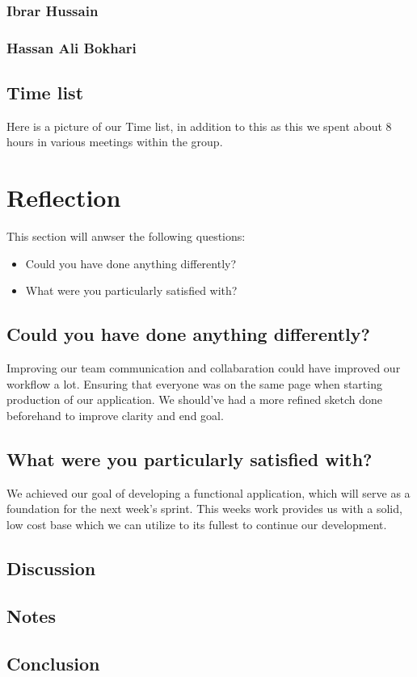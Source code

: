 \documentclass[12pt]{article}
\begin{document}
\subsubsection{Ibrar Hussain}
\subsubsection{Hassan Ali Bokhari}

\subsection{Time list}

Here is a picture of our Time list, in addition to this as this we spent about 8 hours in various meetings within the group.

\section{Reflection}
This section will anwser the following questions:
\begin{itemize}
    \item Could you have done anything differently?
    \item What were you particularly satisfied with?
\end{itemize}

\subsection{Could you have done anything differently?}
Improving our team communication and collabaration could have improved our workflow a lot. Ensuring that everyone was on the 
same page when starting production of our application. We should've had a more refined sketch done beforehand to improve 
clarity and end goal.

\subsection{What were you particularly satisfied with?}
We achieved our goal of developing a functional application, which will serve as a foundation for the next week's sprint. 
This weeks work provides us with a solid, low cost base which we can utilize to its fullest to continue our development.

\subsection{Discussion}

\subsection{Notes}

\subsection{Conclusion}

\printbibliography
\end{document}
